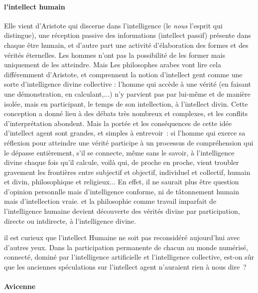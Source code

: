\paragraph{l'intellect humain}
Elle vient d'Aristote qui discerne dans l'intelligence (le \textit{nous} l'esprit qui distingue), une réception passive des informations (intellect passif) présente dans chaque être humain, et d'autre part une activité d'élaboration des formes et des vérités éternelles. Les hommes n'ont pas la possibilité de les former mais uniquement de les atteindre. Mais Les philosophes arabes vont lire cela différemment d'Aristote, et comprennent la notion d'intellect gent comme une sorte d'intelligence divine collective : l'homme qui accède à une vérité (en faisant une démonstration, en calculant,...) n'y parvient pas par lui-même et de manière isolée, mais en participant, le temps de son intellection, à l'intellect divin. Cette conception a donné lieu à des débats très nombreux et complexes, et les conflits d’interprétation abondent. Mais la portée et les conséquences de cette idée d’intellect agent sont grandes, et simples à entrevoir : si l’homme qui exerce sa réflexion pour atteindre une vérité participe à un processus de compréhension qui le dépasse entièrement, s’il se connecte, même sans le savoir, à l’intelligence divine chaque fois qu’il calcule, voilà qui, de proche en proche, vient troubler gravement les frontières entre subjectif et objectif, individuel et collectif, humain et divin, philosophique et religieux... En effet, il ne saurait plus être question d'opinion personnlle mais d'intelligence conforme, ni de tâtonnement humain mais d'intellection vraie. et la philosophie comme travail imparfait de l'intelligence humaine devient découverte des vérités divine par participation, directe ou intdirecte, à l'intelligence divine. 
 
\begin{Synthesis}
  il est curieux que l'intellect Humaine ne soit pas reconsidéré aujourd’hui avec d’autres yeux. Dans la participation permanente de chacun au monde numérisé, connecté, dominé par l’intelligence artificielle et l’intelligence collective, est-on sûr que les anciennes spéculations sur l’intellect agent n’auraient rien à nous dire ? 
 
\end{Synthesis}

 
\paragraph{Avicenne} \label{Theo:Avicenne}

